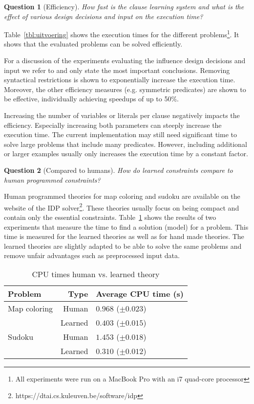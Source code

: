 \documentclass[letterpaper]{article}
\newtheorem{question}{Question}
\theoremstyle{definition}
\begin{document}
\begin{question}[Efficiency]
  How fast is the clause learning system and what is the effect of various design decisions and input on the execution time?
\end{question}

Table~\ref{tbl:uitvoering} shows the execution times for the different problems\footnote{All experiments were run on a MacBook Pro with an i7 quad-core processor}.
It shows that the evaluated problems can be solved efficiently.

For a discussion of the experiments evaluating the influence design decisions and input we refer to \cite{kolb2015thesis} and only state the most important conclusions.
Removing syntactical restrictions is shown to exponentially increase the execution time.
Moreover, the other efficiency measures (e.g. symmetric predicates) are shown to be effective, individually achieving speedups of up to 50\%.

Increasing the number of variables or literals per clause negatively impacts the efficiency.
Especially increasing both parameters can steeply increase the execution time.
The current implementation may still need significant time to solve large problems that include many predicates.
However, including additional or larger examples usually only increases the execution time by a constant factor.

\begin{question}[Compared to humans]
  How do learned constraints compare to human programmed constraints?
\end{question}
Human programmed theories for map coloring and sudoku are available on the website of the IDP solver\footnote{https://dtai.cs.kuleuven.be/software/idp}.
These theories usually focus on being compact and contain only the essential constraints.
Table~\ref{tbl:mens} shows the results of two experiments that measure the time to find a solution (model) for a problem.
This time is measured for the learned theories as well as for hand made theories.
The learned theories are slightly adapted to be able to solve the same problems and remove unfair advantages such as preprocessed input data.

  \begin{table}[!htp]
    \caption{CPU times human vs. learned theory}
    \begin{tabularx}{\linewidth}{lr|X}
      \textbf{Problem} & \textbf{Type} & \textbf{Average CPU time (s)} \\
      \toprule
      Map coloring & Human & $0.968$  ($\pm 0.023$) \\
      & Learned & $0.403$       ($\pm 0.015$) \\
      \midrule
      Sudoku & Human & $1.453$    ($\pm 0.018$) \\
      & Learned & $0.310$       ($\pm 0.012$)
    \end{tabularx}
    \label{tbl:mens}
  \end{table}
\end{document}

